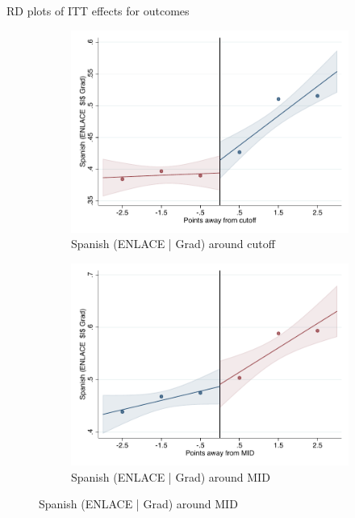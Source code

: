 \documentclass[notes,11pt, aspectratio=169]{beamer}
\begin{document}
\begin{frame}{RD plots of ITT effects for outcomes}
\hyperlink{ITT_rd_plot_IPN}{}
\begin{figure}

    \begin{subfigure}{0.45\textwidth}
        \centering
        \caption{Spanish (ENLACE | Grad) around cutoff}
        \includegraphics[width=\textwidth]{04_Figures/rd_plot_tau_p_esp_3_IPN3.pdf}
    \end{subfigure}
    \begin{subfigure}{0.45\textwidth}
        \centering
        \caption{Spanish (ENLACE | Grad) around MID}
        \includegraphics[width=\textwidth]{04_Figures/rd_plot_mid_p_esp_3_IPN3.pdf}
    \end{subfigure}
    
\end{figure}
\end{frame}
\end{document}
